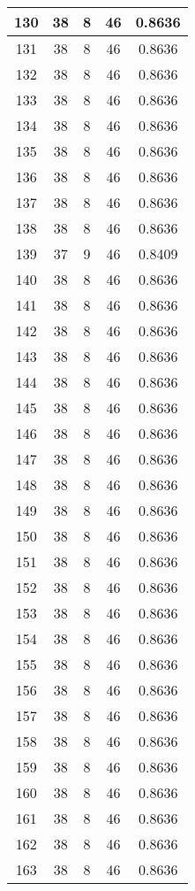 \documentclass[letterpaper, 12pt]{article}
\begin{document}
\begin{longtable}{|c|c|c|c|c|}
\hline
130 & 38 & 8 & 46 & 0.8636 \\
\hline
131 & 38 & 8 & 46 & 0.8636 \\
\hline
132 & 38 & 8 & 46 & 0.8636 \\
\hline
133 & 38 & 8 & 46 & 0.8636 \\
\hline
134 & 38 & 8 & 46 & 0.8636 \\
\hline
135 & 38 & 8 & 46 & 0.8636 \\
\hline
136 & 38 & 8 & 46 & 0.8636 \\
\hline
137 & 38 & 8 & 46 & 0.8636 \\
\hline
138 & 38 & 8 & 46 & 0.8636 \\
\hline
139 & 37 & 9 & 46 & 0.8409 \\
\hline
140 & 38 & 8 & 46 & 0.8636 \\
\hline
141 & 38 & 8 & 46 & 0.8636 \\
\hline
142 & 38 & 8 & 46 & 0.8636 \\
\hline
143 & 38 & 8 & 46 & 0.8636 \\
\hline
144 & 38 & 8 & 46 & 0.8636 \\
\hline
145 & 38 & 8 & 46 & 0.8636 \\
\hline
146 & 38 & 8 & 46 & 0.8636 \\
\hline
147 & 38 & 8 & 46 & 0.8636 \\
\hline
148 & 38 & 8 & 46 & 0.8636 \\
\hline
149 & 38 & 8 & 46 & 0.8636 \\
\hline
150 & 38 & 8 & 46 & 0.8636 \\
\hline
151 & 38 & 8 & 46 & 0.8636 \\
\hline
152 & 38 & 8 & 46 & 0.8636 \\
\hline
153 & 38 & 8 & 46 & 0.8636 \\
\hline
154 & 38 & 8 & 46 & 0.8636 \\
\hline
155 & 38 & 8 & 46 & 0.8636 \\
\hline
156 & 38 & 8 & 46 & 0.8636 \\
\hline
157 & 38 & 8 & 46 & 0.8636 \\
\hline
158 & 38 & 8 & 46 & 0.8636 \\
\hline
159 & 38 & 8 & 46 & 0.8636 \\
\hline
160 & 38 & 8 & 46 & 0.8636 \\
\hline
161 & 38 & 8 & 46 & 0.8636 \\
\hline
162 & 38 & 8 & 46 & 0.8636 \\
\hline
163 & 38 & 8 & 46 & 0.8636 \\

\end{longtable}
\end{document}

